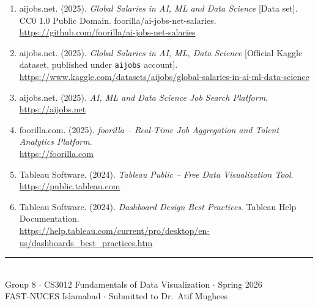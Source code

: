 \documentclass[12pt,a4paper]{article}
\begin{document}
\begin{enumerate}[leftmargin=2em, itemsep=8pt]

  \item aijobs.net. (2025). \textit{Global Salaries in AI, ML and Data Science}
        [Data set]. CC0 1.0 Public Domain. foorilla/ai-jobs-net-salaries.
        \\\url{https://github.com/foorilla/ai-jobs-net-salaries}

  \item aijobs.net. (2025). \textit{Global Salaries in AI, ML, Data Science}
        [Official Kaggle dataset, published under \texttt{aijobs} account].
        \\\url{https://www.kaggle.com/datasets/aijobs/global-salaries-in-ai-ml-data-science}

  \item aijobs.net. (2025). \textit{AI, ML and Data Science Job Search Platform}.
        \\\url{https://aijobs.net}

  \item foorilla.com. (2025). \textit{foorilla -- Real-Time Job Aggregation and
        Talent Analytics Platform}.
        \\\url{https://foorilla.com}

  \item Tableau Software. (2024). \textit{Tableau Public -- Free Data Visualization Tool}.
        \\\url{https://public.tableau.com}

  \item Tableau Software. (2024). \textit{Dashboard Design Best Practices}.
        Tableau Help Documentation.
        \\\url{https://help.tableau.com/current/pro/desktop/en-us/dashboards_best_practices.htm}

\end{enumerate}

\vspace{1cm}
\begin{center}
\textcolor{accentblue}{\rule{0.6\linewidth}{0.5pt}}\\[4pt]
{\small\color{darkgray}
Group 8 $\cdot$ CS3012 Fundamentals of Data Visualization $\cdot$ Spring 2026\\
FAST-NUCES Islamabad $\cdot$ Submitted to Dr.\ Atif Mughees}
\end{center}
\end{document}
